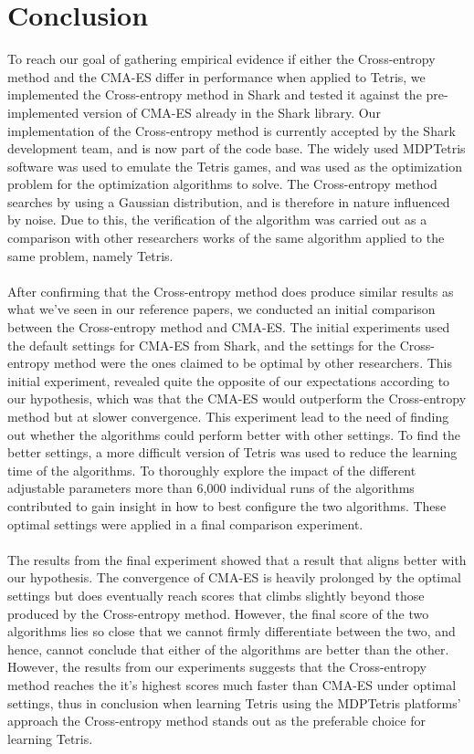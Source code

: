 \section{Conclusion}

To reach our goal of gathering empirical evidence if either the Cross-entropy method
and the CMA-ES differ in performance when applied to Tetris, we implemented the Cross-entropy method in Shark and tested it against the pre-implemented version of CMA-ES
already in the Shark library. Our implementation of the Cross-entropy 
method is currently accepted by the Shark development team, and is now part of the code base.
The widely used MDPTetris software was used to emulate the
Tetris games, and was used as the optimization problem for the optimization algorithms to solve.
The Cross-entropy method searches by using a Gaussian 
distribution, and is therefore in nature influenced by noise. Due to this, 
the verification of the algorithm was carried out as a comparison with other 
researchers works of the same algorithm applied to the same problem, namely Tetris.\\
\\
After confirming that the Cross-entropy method does produce similar results as 
what we've seen in our reference papers, we conducted an initial comparison between the
Cross-entropy method and CMA-ES. The initial experiments used the default settings for CMA-ES
from Shark,
and the settings for the Cross-entropy method were the ones claimed to be optimal by other 
researchers. This initial experiment, revealed quite the opposite of our expectations 
according to our hypothesis, which was that the CMA-ES would outperform the Cross-entropy method
but at slower convergence. This experiment lead to the need of finding out whether the algorithms
could perform better with other settings. To find the better settings, a more difficult version
of Tetris was used to reduce the learning time of the algorithms. To thoroughly explore 
the impact of the different adjustable parameters more than 6,000 individual runs of the 
algorithms contributed to gain insight in how to best configure the two algorithms. These 
optimal settings were applied in a final comparison experiment.\\
\\
The results from the final experiment showed that a result that aligns better with our
hypothesis. The convergence of CMA-ES is heavily prolonged by the optimal settings
but does eventually reach scores that climbs slightly beyond those produced by the
Cross-entropy method. However, the final score of the two algorithms lies so close that
we cannot firmly differentiate between the two, and hence, cannot conclude that either of the
algorithms are better than the other. However, the results from our experiments 
suggests that the Cross-entropy method reaches the 
it's highest scores much faster than CMA-ES under optimal settings, thus in conclusion
when learning Tetris using the MDPTetris platforms' approach the Cross-entropy method 
stands out as the preferable choice for learning Tetris.

